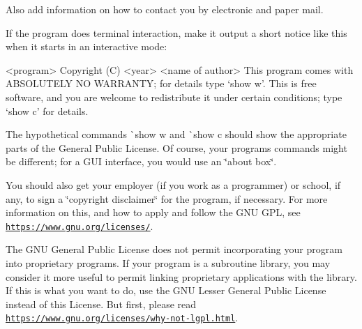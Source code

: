Also add information on how to contact you by electronic and paper mail.

If the program does terminal interaction, make it output a short notice like this when it starts in an interactive mode\+: \begin{DoxyVerb}    <program>  Copyright (C) <year>  <name of author>
    This program comes with ABSOLUTELY NO WARRANTY; for details type `show w'.
    This is free software, and you are welcome to redistribute it
    under certain conditions; type `show c' for details.
\end{DoxyVerb}


The hypothetical commands \`{}show w\textquotesingle{} and \`{}show c\textquotesingle{} should show the appropriate parts of the General Public License. Of course, your program\textquotesingle{}s commands might be different; for a G\+UI interface, you would use an \char`\"{}about box\char`\"{}.

You should also get your employer (if you work as a programmer) or school, if any, to sign a \char`\"{}copyright disclaimer\char`\"{} for the program, if necessary. For more information on this, and how to apply and follow the G\+NU G\+PL, see \href{https://www.gnu.org/licenses/}{\tt https\+://www.\+gnu.\+org/licenses/}.

The G\+NU General Public License does not permit incorporating your program into proprietary programs. If your program is a subroutine library, you may consider it more useful to permit linking proprietary applications with the library. If this is what you want to do, use the G\+NU Lesser General Public License instead of this License. But first, please read \href{https://www.gnu.org/licenses/why-not-lgpl.html}{\tt https\+://www.\+gnu.\+org/licenses/why-\/not-\/lgpl.\+html}. 